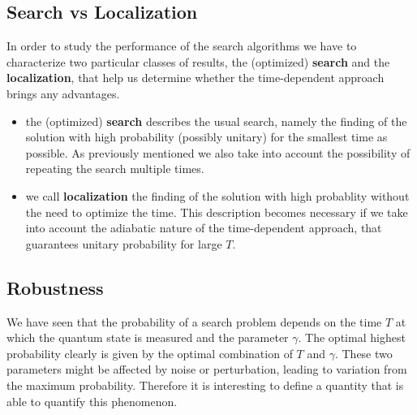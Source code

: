     \subsection{Search vs Localization}
      In order to study the performance of the search algorithms we have to characterize two particular classes of results, the (optimized) \textbf{search} and the \textbf{localization}, that help us determine whether the time-dependent approach brings any advantages.
      \begin{itemize}
          \item the (optimized) \textbf{search} describes the usual search, namely the finding of the solution with high probability (possibly unitary) for the smallest time as possible. As previously mentioned we also take into account the possibility of repeating the search multiple times.
          \item we call \textbf{localization} the finding of the solution with high probablity without the need to optimize the time. This description becomes necessary if we take into account the adiabatic nature of the time-dependent approach, that guarantees unitary probability for large $T$.
      \end{itemize}

    \subsection{Robustness}\label{subsec:robustness}
        We have seen that the probability of a search problem depends on the time $T$ at which the quantum state is measured and the parameter $\gamma$. The optimal highest probability clearly is given by the optimal combination of $T$ and $\gamma$. These two parameters might be affected by noise or perturbation, leading to variation from the maximum probability. Therefore it is interesting to define a quantity that is able to quantify this phenomenon.

